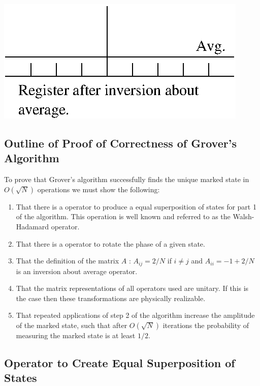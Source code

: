 \documentclass[]{article}
\begin{document}
\includegraphics{a.eps}


\subsection{Outline of Proof of Correctness of Grover's Algorithm}

To prove that Grover's algorithm successfully finds the unique marked
state in $O(\sqrt{N})$ operations we must show the following:

\begin{enumerate}
\item
That there is a operator to produce a equal superposition of states
for part 1 of the algorithm.  This operation is well known and referred
to as the Walsh-Hadamard operator.

\item 
That there is a operator to rotate the phase of a given state.

\item
That the definition of the matrix $A$ : $A_{ij} = 2/N$ if $i \not = j$
and $A_{ii} = -1 + 2/N$ is an inversion about average operator.

\item
That the matrix representations of all operators used are unitary.  If
this is the case then these transformations are physically realizable.

\item
That repeated applications of step 2 of the algorithm increase the
amplitude of the marked state, such that after $O(\sqrt{N})$
iterations the probability of measuring the marked state is at least
$1/2$.

\end{enumerate}

\subsection{Operator to Create Equal Superposition of States}
\end{document}
